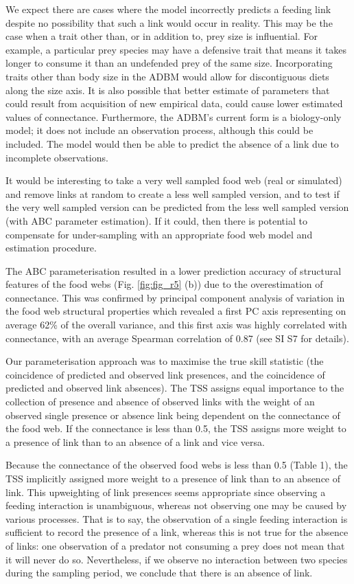 \documentclass{article}
\begin{document}
We expect there are cases where the model incorrectly predicts a feeding
link despite no possibility that such a link would occur in reality.
This may be the case when a trait other than, or in addition to, prey
size is influential. For example, a particular prey species may have a
defensive trait that means it takes longer to consume it than an
undefended prey of the same size. Incorporating traits other than body
size in the ADBM would allow for discontiguous diets along the size
axis. It is also possible that better estimate of parameters that could
result from acquisition of new empirical data, could cause lower
estimated values of connectance. Furthermore, the ADBM's current form is
a biology-only model; it does not include an observation process,
although this could be included. The model would then be able to predict
the absence of a link due to incomplete observations.

It would be interesting to take a very well sampled food web (real or
simulated) and remove links at random to create a less well sampled
version, and to test if the very well sampled version can be predicted
from the less well sampled version (with ABC parameter estimation). If
it could, then there is potential to compensate for under-sampling with
an appropriate food web model and estimation procedure.

The ABC parameterisation resulted in a lower prediction accuracy of
structural features of the food webs (Fig. \ref{fig:fig_r5} (b)) due to
the overestimation of connectance. This was confirmed by principal
component analysis of variation in the food web structural properties
which revealed a first PC axis representing on average 62\% of the
overall variance, and this first axis was highly correlated with
connectance, with an average Spearman correlation of 0.87 (see SI S7 for
details).

Our parameterisation approach was to maximise the true skill statistic
(the coincidence of predicted and observed link presences, and the
coincidence of predicted and observed link absences). The TSS assigns
equal importance to the collection of presence and absence of observed
links with the weight of an observed single presence or absence link
being dependent on the connectance of the food web. If the connectance
is less than 0.5, the TSS assigns more weight to a presence of link than
to an absence of a link and vice versa.

Because the connectance of the observed food webs is less than 0.5
(Table 1), the TSS implicitly assigned more weight to a presence of link
than to an absence of link. This upweighting of link presences seems
appropriate since observing a feeding interaction is unambiguous,
whereas not observing one may be caused by various processes. That is to
say, the observation of a single feeding interaction is sufficient to
record the presence of a link, whereas this is not true for the absence
of links: one observation of a predator not consuming a prey does not
mean that it will never do so. Nevertheless, if we observe no
interaction between two species during the sampling period, we conclude
that there is an absence of link.
\end{document}
